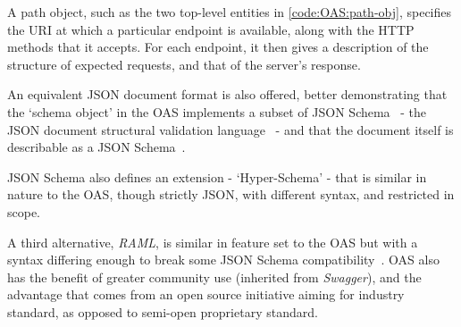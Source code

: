 A path object, such as the two top-level entities in \cref{code:OAS:path-obj}, specifies the URI at which a particular endpoint is available, along with the HTTP methods that it accepts. For each endpoint, it then gives a description of the structure of expected requests, and that of the server's response.

An equivalent JSON document format is also offered, better demonstrating that the `schema object' in the OAS implements a subset of JSON Schema~\cite{oas_v3} - the JSON document structural validation language~\cite{json_schema} - and that the document itself is describable as a JSON Schema~\cite{oas_json_schema}.

JSON Schema also defines an extension - `Hyper-Schema' - that is similar in nature to the OAS, though strictly JSON, with different syntax, and restricted in scope. \cite{leach_elegant_apis_2014}

A third alternative, \emph{RAML}, is similar in feature set to the OAS but with a syntax differing enough to break some JSON Schema compatibility~\cite{raml_v1}. OAS also has the benefit of greater community use (inherited from \emph{Swagger}), and the advantage that comes from an open source initiative aiming for industry standard, as opposed to semi-open proprietary standard.